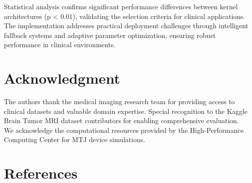 \documentclass[conference]{IEEEtran}
\begin{document}
Statistical analysis confirms significant performance differences between kernel architectures (p < 0.01), validating the selection criteria for clinical applications. The implementation addresses practical deployment challenges through intelligent fallback systems and adaptive parameter optimization, ensuring robust performance in clinical environments.

\section*{Acknowledgment}

The authors thank the medical imaging research team for providing access to clinical datasets and valuable domain expertise. Special recognition to the Kaggle Brain Tumor MRI dataset contributors for enabling comprehensive evaluation. We acknowledge the computational resources provided by the High-Performance Computing Center for MTJ device simulations.

\section*{References}
\end{document}
